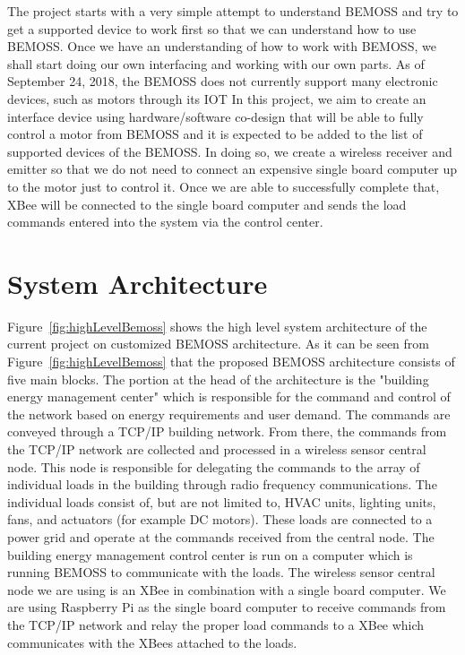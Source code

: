\documentclass[12pt]{article} %
\begin{document}
The project starts with a very simple attempt to understand BEMOSS and try to get a supported device to work first so that we can understand how to use BEMOSS. Once we have an understanding of how to work with BEMOSS, we shall start doing our own interfacing and working with our own parts.
\newline
\newline
As of September 24, 2018, the BEMOSS does not currently support many electronic devices, such as motors through its IOT In this project, we aim to create an interface device using hardware/software co-design that will be able to fully control a motor from BEMOSS and it is expected to be added to the list of supported devices of the BEMOSS. In doing so, we create a wireless receiver and emitter so that we do not need to connect an expensive single board computer up to the motor just to control it. Once we are able to successfully complete that, XBee will be connected to the single board computer and sends the load commands entered into the system via the control center.

\section{System Architecture}
Figure~\ref{fig:highLevelBemoss} shows the high level system architecture of the current project on customized BEMOSS architecture. As it can be seen from Figure~\ref{fig:highLevelBemoss}  that the proposed BEMOSS architecture consists of five main blocks. The portion at the head of the architecture is the "building energy management center" which is responsible for the command and control of the network based on energy requirements and user demand. The commands are conveyed through a TCP/IP building network. From there, the commands from the TCP/IP network are collected and processed in a wireless sensor central node. This node is responsible for delegating the commands to the array of individual loads in the building through radio frequency communications. The individual loads consist of, but are not limited to, HVAC units, lighting units, fans, and actuators (for example DC motors). These loads are connected to a power grid and operate at the commands received from the central node. 
\newline
\newline
The building energy management control center is run on a computer which is running BEMOSS to communicate with the loads. The wireless sensor central node we are using is an XBee in combination with a single board computer. We are using Raspberry Pi as the single board computer to receive commands from the TCP/IP network and relay the proper load commands to a XBee which communicates with the XBees attached to the loads. 
\end{document}
